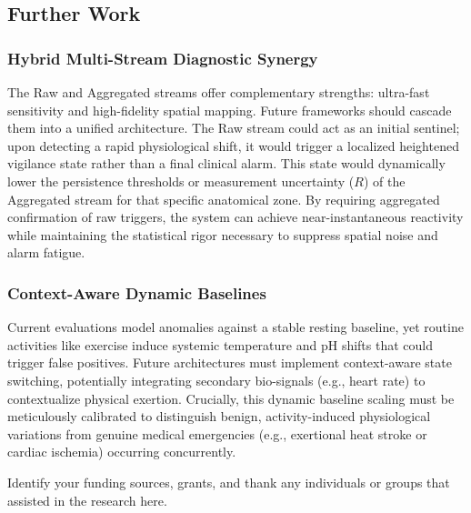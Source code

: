 \documentclass[sigconf]{acmart}
\begin{document}
\subsection{Further Work}

\subsubsection{Hybrid Multi-Stream Diagnostic Synergy}
The Raw and Aggregated streams offer complementary strengths: ultra-fast sensitivity and high-fidelity spatial mapping. Future frameworks should cascade them into a unified architecture. The Raw stream could act as an initial sentinel; upon detecting a rapid physiological shift, it would trigger a localized heightened vigilance state rather than a final clinical alarm. This state would dynamically lower the persistence thresholds or measurement uncertainty ($R$) of the Aggregated stream for that specific anatomical zone. By requiring aggregated confirmation of raw triggers, the system can achieve near-instantaneous reactivity while maintaining the statistical rigor necessary to suppress spatial noise and alarm fatigue.

\subsubsection{Context-Aware Dynamic Baselines}
Current evaluations model anomalies against a stable resting baseline, yet routine activities like exercise induce systemic temperature and pH shifts that could trigger false positives. Future architectures must implement context-aware state switching, potentially integrating secondary bio-signals (e.g., heart rate) to contextualize physical exertion. Crucially, this dynamic baseline scaling must be meticulously calibrated to distinguish benign, activity-induced physiological variations from genuine medical emergencies (e.g., exertional heat stroke or cardiac ischemia) occurring concurrently.

\begin{acks}
Identify your funding sources, grants, and thank any individuals or groups that assisted in the research here.
\end{acks}


\end{document}
